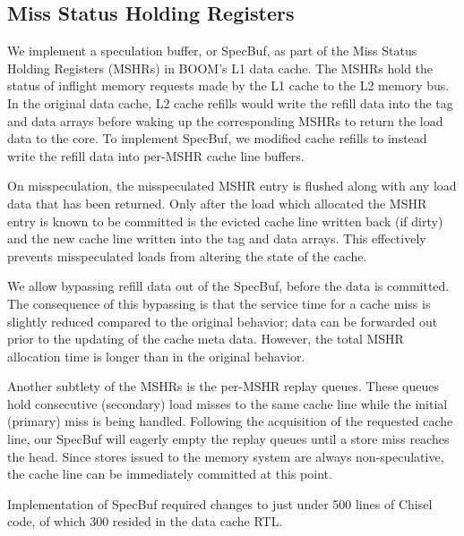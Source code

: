\subsection{Miss Status Holding Registers}
We implement a speculation buffer, or SpecBuf, as part of the Miss Status Holding Registers (MSHRs) in BOOM's L1 data cache. The MSHRs hold the status of inflight memory requests made by the L1 cache to the L2 memory bus.
In the original data cache, L2 cache refills would write the refill data into the tag and data arrays before waking up the corresponding MSHRs to return the load data to the core.
To implement SpecBuf, we modified cache refills to instead write the refill data into per-MSHR cache line buffers.

On misspeculation, the misspeculated MSHR entry is flushed along with any load data that has been returned. Only after the load which allocated the MSHR entry is known to be committed is the evicted cache line written back (if dirty) and the new cache line written into the tag and data arrays. This effectively prevents misspeculated loads from altering the state of the cache.

We allow bypassing refill data out of the SpecBuf, before the data is committed. The consequence of this bypassing is that the service time for a cache miss is slightly reduced compared to the original behavior; data can be forwarded out prior to the updating of the cache meta data. However, the total MSHR allocation time is longer than in the original behavior.

Another subtlety of the MSHRs is the per-MSHR replay queues. These queues hold consecutive (secondary) load misses to the same cache line while the initial (primary) miss is being handled. Following the acquisition of the requested cache line, our SpecBuf will eagerly empty the replay queues until a store miss reaches the head. Since stores issued to the memory system are always non-speculative, the cache line can be immediately committed at this point.

Implementation of SpecBuf required changes to just under 500 lines of Chisel code, of which 300 resided in the data cache RTL.

